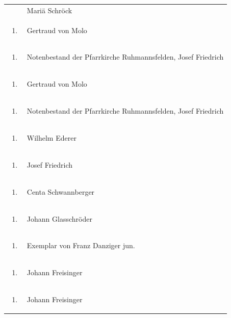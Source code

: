 \documentclass[a4paper]{article}
\begin{document}
\begin{flushleft}
\begin{supertabular}{m{1.2409999cm}m{14.604cm}}
 &
Mariä Schröck\\
\begin{enumerate}
\item
\end{enumerate}
 &
Gertraud von Molo\\
\begin{enumerate}
\item
\end{enumerate}
 &
Notenbestand der Pfarrkirche Ruhmannsfelden, Josef Friedrich\\
\begin{enumerate}
\item
\end{enumerate}
 &
Gertraud von Molo\\
\begin{enumerate}
\item
\end{enumerate}
 &
Notenbestand der Pfarrkirche Ruhmannsfelden, Josef Friedrich\\
\begin{enumerate}
\item
\end{enumerate}
 &
Wilhelm Ederer\\
\begin{enumerate}
\item
\end{enumerate}
 &
Josef Friedrich\\
\begin{enumerate}
\item
\end{enumerate}
 &
Centa Schwannberger\\
\begin{enumerate}
\item
\end{enumerate}
 &
Johann Glasschröder\\
\begin{enumerate}
\item
\end{enumerate}
 &
Exemplar von Franz Danziger jun.\\
\begin{enumerate}
\item
\end{enumerate}
 &
Johann Freisinger\\
\begin{enumerate}
\item
\end{enumerate}
 &
Johann Freisinger\\

\end{supertabular}
\end{flushleft}
\end{document}
